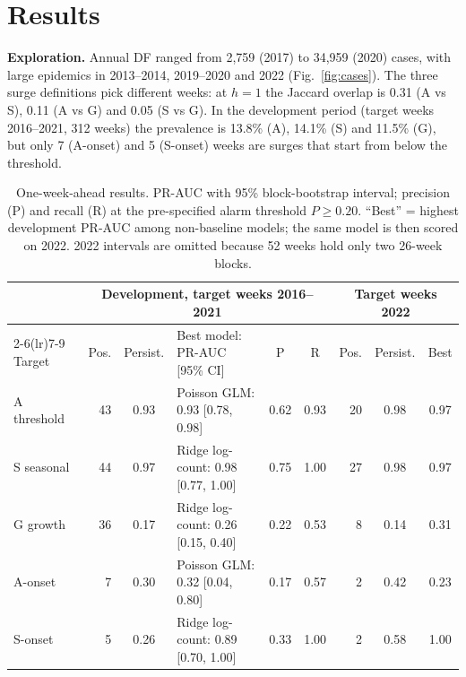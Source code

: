 \section{Results}
\label{sec:results}
\textbf{Exploration.} Annual DF ranged from 2{,}759 (2017) to 34{,}959 (2020) cases, with large
epidemics in 2013--2014, 2019--2020 and 2022 (Fig.~\ref{fig:cases}). The three surge
definitions pick different weeks: at $h=1$ the Jaccard overlap is 0.31 (A vs S), 0.11 (A vs G)
and 0.05 (S vs G). In the development period (target weeks 2016--2021, 312 weeks) the
prevalence is 13.8\% (A), 14.1\% (S) and 11.5\% (G), but only 7 (A-onset) and 5 (S-onset)
weeks are surges that start from below the threshold.

\begin{table}[ht]
\centering\small
\caption{One-week-ahead results. PR-AUC with 95\% block-bootstrap interval; precision (P) and
recall (R) at the pre-specified alarm threshold $P\ge0.20$. ``Best'' = highest development
PR-AUC among non-baseline models; the same model is then scored on 2022. 2022 intervals are
omitted because 52 weeks hold only two 26-week blocks.}
\label{tab:main}
\begin{tabular}{l r c l c c r c c}
\toprule
 & \multicolumn{5}{c}{Development, target weeks 2016--2021} & \multicolumn{3}{c}{Target weeks 2022}\\
\cmidrule(lr){2-6}\cmidrule(lr){7-9}
Target & Pos. & Persist. & Best model: PR-AUC [95\% CI] & P & R & Pos. & Persist. & Best\\
\midrule
A threshold & 43 & 0.93 & Poisson GLM: 0.93 [0.78, 0.98] & 0.62 & 0.93 & 20 & 0.98 & 0.97\\
S seasonal  & 44 & 0.97 & Ridge log-count: 0.98 [0.77, 1.00] & 0.75 & 1.00 & 27 & 0.98 & 0.97\\
G growth    & 36 & 0.17 & Ridge log-count: 0.26 [0.15, 0.40] & 0.22 & 0.53 & 8 & 0.14 & 0.31\\
A-onset     & 7  & 0.30 & Poisson GLM: 0.32 [0.04, 0.80] & 0.17 & 0.57 & 2 & 0.42 & 0.23\\
S-onset     & 5  & 0.26 & Ridge log-count: 0.89 [0.70, 1.00] & 0.33 & 1.00 & 2 & 0.58 & 1.00\\
\bottomrule
\end{tabular}
\end{table}

